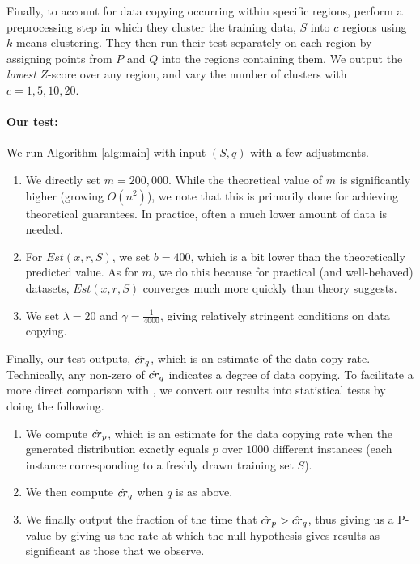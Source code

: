 Finally, to account for data copying occurring within specific regions, \cite{MCD2020} perform a preprocessing step in which they cluster the training data, $S$ into $c$ regions using $k$-means clustering. They then run their test separately on each region by assigning points from $P$ and $Q$ into the regions containing them. We output the \textit{lowest} $Z$-score over any region, and vary the number of clusters with $c= 1, 5, 10, 20$. 

\paragraph{Our test:} We run Algorithm \ref{alg:main} with input $(S, q)$ with a few adjustments.
\begin{enumerate}
	\item We directly set $m = 200,000$. While the theoretical value of $m$ is significantly higher (growing $O(n^2)$), we note that this is primarily done for achieving theoretical guarantees. In practice, often a much lower amount of data is needed.
	\item For $Est(x, r, S)$, we set $b= 400$, which is a bit lower than the theoretically predicted value. As for $m$, we do this because for practical (and well-behaved) datasets, $Est(x, r, S)$ converges much more quickly than theory suggests. 
	\item We set $\lambda = 20$ and $\gamma = \frac{1}{4000}$, giving relatively stringent conditions on data copying. 
\end{enumerate}
Finally, our test outputs, $\hat{cr}_q$, which is an estimate of the data copy rate. Technically, any non-zero of $\hat{cr}_q$ indicates a degree of data copying. To facilitate a more direct comparison with \cite{MCD2020}, we convert our results into statistical tests by doing the following.
\begin{enumerate}
	\item We compute $\hat{cr}_p$, which is an estimate for the data copying rate when the generated distribution exactly equals $p$ over $1000$ different instances (each instance corresponding to a freshly drawn training set $S$).
	\item We then compute $\hat{cr}_q$ when $q$ is as above.
	\item We finally output the fraction of the time that $\hat{cr}_p > \hat{cr}_q$, thus giving us a P-value by giving us the rate at which the null-hypothesis gives results as significant as those that we observe. 
\end{enumerate} 

